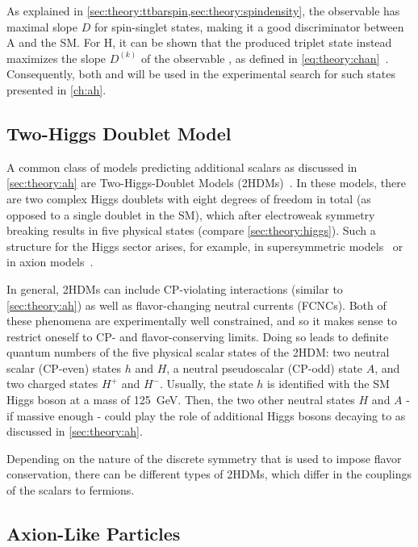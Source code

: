 As explained in \cref{sec:theory:ttbarspin,sec:theory:spindensity}, the observable \chel has maximal slope $D$ for spin-singlet states, making it a good discriminator between A and the SM. For H, it can be shown that the produced triplet state instead maximizes the slope $D^{(k)}$ of the observable \chan, as defined in \cref{eq:theory:chan}~\cite{Maltoni:2024tul}. Consequently, both \chel and \chan will be used in the experimental search for such states presented in \cref{ch:ah}.

\subsection{Two-Higgs Doublet Model}
\label{sec:theory:twohdm}

A common class of models predicting additional scalars as discussed in \cref{sec:theory:ah} are Two-Higgs-Doublet Models (2HDMs)~\cite{Lee:1973iz,Branco:2011iw}. In these models, there are two complex Higgs doublets with eight degrees of freedom in total (as opposed to a single doublet in the SM), which after electroweak symmetry breaking results in five physical states (compare \cref{sec:theory:higgs}). Such a structure for the Higgs sector arises, for example, in supersymmetric models~\cite{Haber:1984rc} or in axion models~\cite{Kim:1986ax}.

In general, 2HDMs can include CP-violating interactions (similar to \cref{sec:theory:ah}) as well as flavor-changing neutral currents (FCNCs). Both of these phenomena are experimentally well constrained, and so it makes sense to restrict oneself to CP- and flavor-conserving limits. Doing so leads to definite quantum numbers of the five physical scalar states of the 2HDM: two neutral scalar (CP-even) states $h$ and $H$, a neutral pseudoscalar (CP-odd) state $A$, and two charged states $H^+$ and $H^-$. Usually, the state $h$ is identified with the SM Higgs boson at a mass of \SI{125}{\GeV}. Then, the two other neutral states $H$ and $A$ - if massive enough - could play the role of additional Higgs bosons decaying to \ttbar as discussed in \cref{sec:theory:ah}.

Depending on the nature of the discrete symmetry that is used to impose flavor conservation, there can be different types of 2HDMs, which differ in the couplings of the scalars to fermions. 

\subsection{Axion-Like Particles}
\label{sec:theory:alps}

